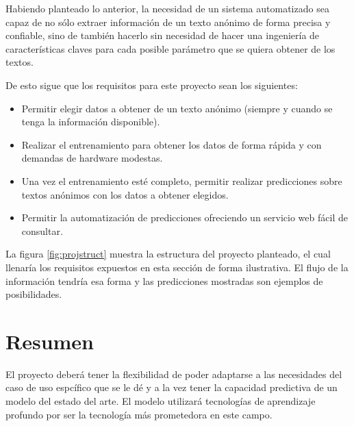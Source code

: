 Habiendo planteado lo anterior, la necesidad de un sistema automatizado sea capaz de no sólo extraer información de un texto anónimo de forma precisa y confiable, sino de también hacerlo sin necesidad de hacer una ingeniería de características claves para cada posible parámetro que se quiera obtener de los textos.

De esto sigue que los requisitos para este proyecto sean los siguientes:

\begin{itemize}
\item Permitir elegir datos a obtener de un texto anónimo (siempre y cuando se tenga la información disponible).
\item Realizar el entrenamiento para obtener los datos de forma rápida y con demandas de hardware modestas.
\item Una vez el entrenamiento esté completo, permitir realizar predicciones sobre textos anónimos con los datos a obtener elegidos.
\item Permitir la automatización de predicciones ofreciendo un servicio web fácil de consultar.
\end{itemize}

La figura \ref{fig:projstruct} muestra la estructura del proyecto planteado, el cual llenaría los requisitos expuestos en esta sección de forma ilustrativa. El flujo de la información tendría esa forma y las predicciones mostradas son ejemplos de posibilidades.

\section{Resumen}

El proyecto deberá tener la flexibilidad de poder adaptarse a las necesidades del caso de uso espcífico que se le dé y a la vez tener la capacidad predictiva de un modelo del estado del arte. El modelo utilizará tecnologías de aprendizaje profundo por ser la tecnología más prometedora en este campo.





